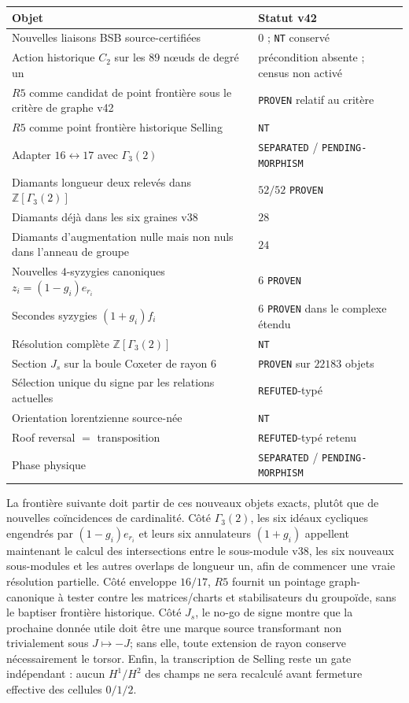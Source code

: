\documentclass[11pt,a4paper]{article}
\newcommand{\certProven}{\texttt{PROVEN}}
\newcommand{\certRefuted}{\texttt{REFUTED}}
\newcommand{\certSeparated}{\texttt{SEPARATED}}
\newcommand{\certPending}{\texttt{PENDING-MORPHISM}}
\newcommand{\certNT}{\texttt{NT}}
\begin{document}
\begin{center}
\begin{tabularx}{\textwidth}{@{}Xl@{}}
\toprule
Objet & Statut v42\\
\midrule
Nouvelles liaisons BSB source-certifiées & $0$ ; \certNT{} conservé\\
Action historique $C_2$ sur les $89$ nœuds de degré un & précondition absente ; census non activé\\
$R5$ comme candidat de point frontière sous le critère de graphe v42 & \certProven{} relatif au critère\\
$R5$ comme point frontière historique Selling & \certNT\\
Adapter $16\leftrightarrow17$ avec $\Gamma_3(2)$ & \certSeparated{} / \certPending\\
Diamants longueur deux relevés dans $\mathbb Z[\Gamma_3(2)]$ & $52/52$ \certProven\\
Diamants déjà dans les six graines v38 & $28$\\
Diamants d'augmentation nulle mais non nuls dans l'anneau de groupe & $24$\\
Nouvelles $4$-syzygies canoniques $z_i=(1-g_i)e_{r_i}$ & $6$ \certProven\\
Secondes syzygies $(1+g_i)f_i$ & $6$ \certProven{} dans le complexe étendu\\
Résolution complète $\mathbb Z[\Gamma_3(2)]$ & \certNT\\
Section $J_s$ sur la boule Coxeter de rayon $6$ & \certProven{} sur $22183$ objets\\
Sélection unique du signe par les relations actuelles & \certRefuted{}-typé\\
Orientation lorentzienne source-née & \certNT\\
Roof reversal $=$ transposition & \certRefuted{}-typé retenu\\
Phase physique & \certSeparated{} / \certPending\\
\bottomrule
\end{tabularx}
\end{center}

La frontière suivante doit partir de ces nouveaux objets exacts, plutôt que de nouvelles coïncidences de cardinalité. Côté $\Gamma_3(2)$, les six idéaux cycliques engendrés par $(1-g_i)e_{r_i}$ et leurs six annulateurs $(1+g_i)$ appellent maintenant le calcul des intersections entre le sous-module v38, les six nouveaux sous-modules et les autres overlaps de longueur un, afin de commencer une vraie résolution partielle. Côté enveloppe $16/17$, $R5$ fournit un pointage graph-canonique à tester contre les matrices/charts et stabilisateurs du groupoïde, sans le baptiser frontière historique. Côté $J_s$, le no-go de signe montre que la prochaine donnée utile doit être une marque source transformant non trivialement sous $J\mapsto-J$; sans elle, toute extension de rayon conserve nécessairement le torsor. Enfin, la transcription de Selling reste un gate indépendant : aucun $H^1/H^2$ des champs ne sera recalculé avant fermeture effective des cellules $0/1/2$.
\end{document}
